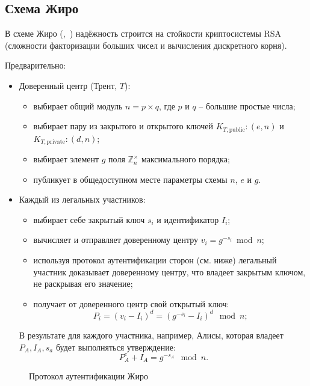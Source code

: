 \subsection{Схема Жиро}\label{section-girault-scheme}

В схеме Жиро (,~\cite{Girault:1990, Girault:1991}) надёжность строится на стойкости криптосистемы RSA (сложности факторизации больших чисел и вычисления дискретного корня).

Предварительно:
\begin{itemize}
    \item Доверенный центр (Трент, $T$):
    \begin{itemize}
        \item выбирает общий модуль $n = p \times q$, где $p$ и $q$ -- большие простые числа;
        \item выбирает пару из закрытого и открытого ключей $K_{T, \text{public}}: (e, n)$ и $K_{T, \text{private}}: (d, n)$;
        \item выбирает элемент $g$ поля $\mathbb{Z}_n^{\times}$ максимального порядка;
        \item публикует в общедоступном месте параметры схемы $n$, $e$ и $g$.
    \end{itemize}
    \item Каждый из легальных участников:
    \begin{itemize}
        \item выбирает себе закрытый ключ $s_i$ и идентификатор $I_i$;
        \item вычисляет и отправляет доверенному центру $v_i = g^{-s_i} \bmod n$;
        \item используя протокол аутентификации сторон (см. ниже) легальный участник доказывает доверенному центру, что владеет закрытым ключом, не раскрывая его значение;
        \item получает от доверенного центр свой открытый ключ:
            \[ P_i = (v_i - I_i)^d = (g^{-s_i} - I_i)^d \mod n; \]
    \end{itemize}
    В результате для каждого участника, например, Алисы, которая владеет $P_A, I_A, s_a$ будет выполняться утверждение:
        \[ P_A^e + I_A = g^{-s_A} \mod n. \]
\end{itemize}

\begin{figure}
	\centering
	\begin{sequencediagram}

	\end{sequencediagram}
	\caption{Протокол аутентификации Жиро\label{fig:key_distribution-girault-auth}}
\end{figure}

